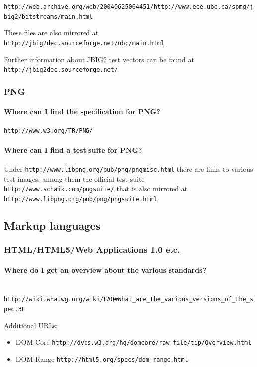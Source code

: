 \documentclass[10pt]{scrbook}
\begin{document}
\verb|http://web.archive.org/web/20040625064451/http://www.ece.ubc.ca/spmg/jbig2/bitstreams/main.html|

These files are also mirrored at \verb|http://jbig2dec.sourceforge.net/ubc/main.html|

Further information about JBIG2 test vectors can be found at \verb|http://jbig2dec.sourceforge.net/|

\subsubsection{PNG}

\paragraph{Where can I find the specification for PNG?} \verb|http://www.w3.org/TR/PNG/|

\paragraph{Where can I find a test suite for PNG?}

Under \verb|http://www.libpng.org/pub/png/pngmisc.html| there are links to various test images; among them the official test suite \verb|http://www.schaik.com/pngsuite/| that is also mirrored at \verb|http://www.libpng.org/pub/png/pngsuite.html|.

\subsection{Markup languages}

\subsubsection{HTML/HTML5/Web Applications 1.0 etc.}

\paragraph{Where do I get an overview about the various standards?} ~ \\
\verb|http://wiki.whatwg.org/wiki/FAQ#What_are_the_various_versions_of_the_spec.3F|

Additional URLs:
\begin{itemize}
\item DOM Core \verb|http://dvcs.w3.org/hg/domcore/raw-file/tip/Overview.html|
\item DOM Range \verb|http://html5.org/specs/dom-range.html|
\end{itemize}
\end{document}
